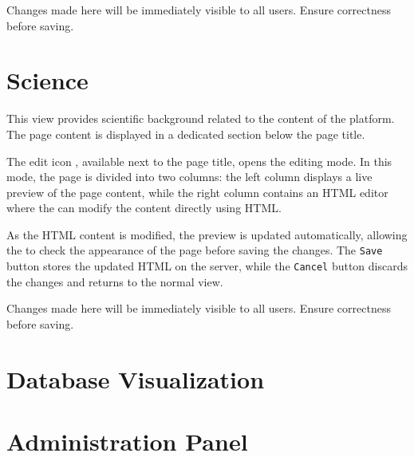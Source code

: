 \warning Changes made here will be immediately visible to all users. Ensure correctness before saving.



\chapter{Science} \label{chap:admin-science} 

This view provides scientific background related to the content of the platform. The page content is displayed in a dedicated section below the page title.


The edit icon {\scriptsize \grayblue{\faEdit{}}}, available next to the page title, opens the editing mode. In this mode, the page is divided into two columns: the left column displays a live preview of the page content, while the right column contains an HTML editor where the \admin can modify the content directly using HTML.


As the HTML content is modified, the preview is updated automatically, allowing the \admin to check the appearance of the page before saving the changes. The \texttt{Save} button stores the updated HTML on the server, while the \texttt{Cancel} button discards the changes and returns to the normal view.

\warning Changes made here will be immediately visible to all users. Ensure correctness before saving.



\chapter{Database Visualization} \label{chap:admin-database}



\chapter{Administration Panel} \label{chap:admin-panel}




